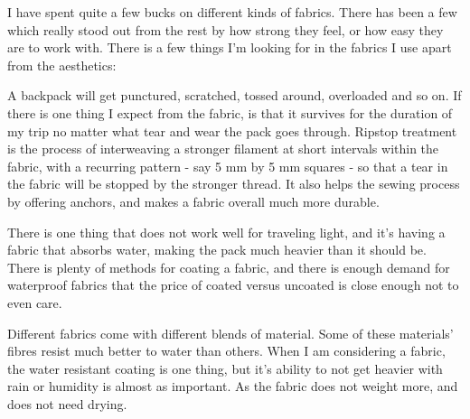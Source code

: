 I have spent quite a few bucks on different kinds of fabrics. There has been a few which really stood out from the rest by how strong they feel, or how easy they are to work with. There is a few things I'm looking for in the fabrics I use apart from the aesthetics:

\begin{description}

  \item [Ripstop] A backpack will get punctured, scratched, tossed around, overloaded and so on. If there is one thing I expect from the fabric, is that it survives for the duration of my trip no matter what tear and wear the pack goes through. Ripstop treatment is the process of interweaving a stronger filament at short intervals within the fabric, with a recurring pattern - say 5 mm by 5 mm squares - so that a tear in the fabric will be stopped by the stronger thread. It also helps the sewing process by offering anchors, and makes a fabric overall much more durable.

  \item [Water resistant coating] There is one thing that does not work well for traveling light, and it's having a fabric that absorbs water, making the pack much heavier than it should be. There is plenty of methods for coating a fabric, and there is enough demand for waterproof fabrics that the price of coated versus uncoated is close enough not to even care.

  \item [Soaking resistance] Different fabrics come with different blends of material. Some of these materials' fibres resist much better to water than others. When I am considering a fabric, the water resistant coating is one thing, but it's ability to not get heavier with rain or humidity is almost as important. As the fabric does not weight more, and does not need drying.

\end{description}
